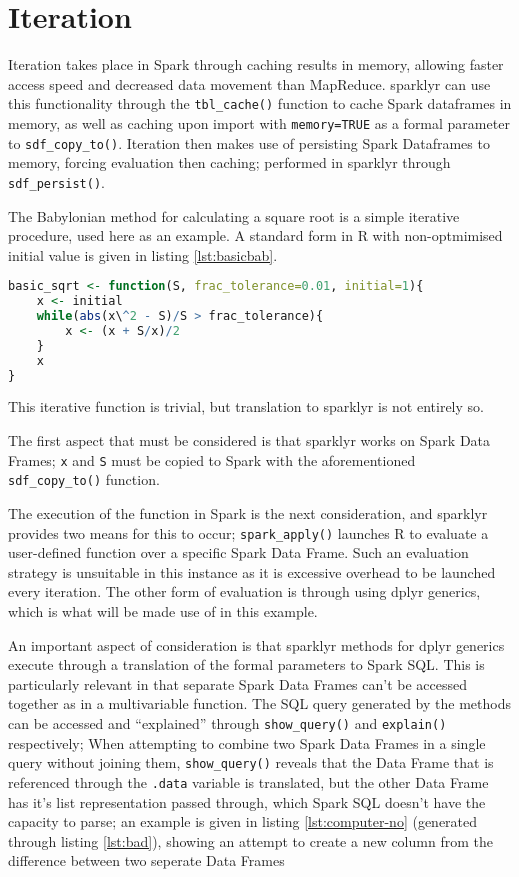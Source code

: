 \documentclass[10pt,a4paper]{article}
\begin{document}
\section{Iteration}

Iteration takes place in Spark through caching results in memory, allowing
faster access speed and decreased data movement than MapReduce.
sparklyr can use this functionality through the \texttt{tbl\_cache()} function
to cache Spark dataframes in memory, as well as caching upon import with
\texttt{memory=TRUE} as a formal parameter to \texttt{sdf\_copy\_to()}. 
Iteration then makes use of persisting Spark Dataframes to memory, forcing
evaluation then caching; performed in sparklyr through \texttt{sdf\_persist()}.

The Babylonian method for calculating a square root is a simple iterative
procedure, used here as an example.
A standard form in R with non-optmimised initial value is given in listing
\ref{lst:basicbab}.

\begin{lstlisting}[language=R, caption={Simple Iteration with the Babylonian Method}, label=lst:basicbab]
basic_sqrt <- function(S, frac_tolerance=0.01, initial=1){
	x <- initial
	while(abs(x\^2 - S)/S > frac_tolerance){
		x <- (x + S/x)/2
	}
	x
}
\end{lstlisting}

This iterative function is trivial, but translation to sparklyr is not entirely so.

The first aspect that must be considered is that sparklyr works on Spark Data
Frames;
\texttt{x} and \texttt{S} must be copied to Spark with the aforementioned
\texttt{sdf\_copy\_to()} function.

The execution of the function in Spark is the next consideration, and sparklyr
provides two means for this to occur;
\texttt{spark\_apply()} launches R to evaluate a user-defined function over a
specific Spark Data Frame. 
Such an evaluation strategy is unsuitable in this instance as it is excessive
overhead to be launched every iteration. 
The other form of evaluation is through using dplyr generics, which is what
will be made use of in this example.

An important aspect of consideration is that sparklyr methods for dplyr
generics execute through a translation of the formal parameters to Spark SQL.
This is particularly relevant in that separate Spark Data Frames can't be
accessed together as in a multivariable function.
The SQL query generated by the methods can be accessed and ``explained''
through \texttt{show\_query()} and \texttt{explain()} respectively;
When attempting to combine two Spark Data Frames in a single query without 
joining them, \texttt{show\_query()} reveals that the Data Frame that is
referenced through the \texttt{.data} variable is translated, but the other
Data Frame has it's list representation passed through, which Spark SQL doesn't
have the capacity to parse; 
an example is given in listing \ref{lst:computer-no} (generated through listing
\ref{lst:bad}), showing an attempt to create a new column from the difference
between two seperate Data Frames
\end{document}

